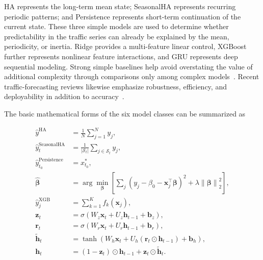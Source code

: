 \documentclass[pdflatex,sn-mathphys-num,iicol]{sn-jnl}
\begin{document}
HA represents the long-term mean state; SeasonalHA represents recurring periodic patterns; and Persistence represents short-term continuation of the current state. These three simple models are used to determine whether predictability in the traffic series can already be explained by the mean, periodicity, or inertia. Ridge provides a multi-feature linear control, XGBoost further represents nonlinear feature interactions, and GRU represents deep sequential modeling. Strong simple baselines help avoid overstating the value of additional complexity through comparisons only among complex models~\cite{Hadry2025TrafficForecasting,Hewamalage2023ForecastEvaluation}. Recent traffic-forecasting reviews likewise emphasize robustness, efficiency, and deployability in addition to accuracy~\cite{Du2025TrafficSurvey,Khatiriolyaee2026TrafficPrediction,Liu2026DeepLearningReview}.

The basic mathematical forms of the six model classes can be summarized as

\begin{equation}
\begin{aligned}
\widehat{y}^{\mathrm{HA}}
&=
\frac{1}{N}
\sum_{j=1}^{N} y_j,
\\[6pt]

\widehat{y}_{t}^{\mathrm{SeasonalHA}}
&=
\frac{1}{|\mathcal{S}_{t}|}
\sum_{j\in\mathcal{S}_{t}} y_j,
\\[6pt]

\widehat{y}_{t_0}^{\mathrm{Persistence}}
&=
x^{*}_{t_0},
\\[8pt]

\widehat{\boldsymbol{\beta}}
&=
\arg\min_{\boldsymbol{\beta}}
\left[
\sum_j
\left(
y_j-\beta_0-\mathbf{x}_j^{\top}\boldsymbol{\beta}
\right)^2
+
\lambda
\left\|
\boldsymbol{\beta}
\right\|_2^2
\right],
\\[8pt]

\widehat{y}_{j}^{\mathrm{XGB}}
&=
\sum_{k=1}^{K}
f_k(\mathbf{x}_j),
\\[8pt]

\mathbf{z}_t
&=
\sigma
\left(
W_z\mathbf{x}_t
+
U_z\mathbf{h}_{t-1}
+
\mathbf{b}_z
\right),
\\[6pt]

\mathbf{r}_t
&=
\sigma
\left(
W_r\mathbf{x}_t
+
U_r\mathbf{h}_{t-1}
+
\mathbf{b}_r
\right),
\\[6pt]

\widetilde{\mathbf{h}}_t
&=
\tanh
\left(
W_h\mathbf{x}_t
+
U_h
\left(
\mathbf{r}_t
\odot
\mathbf{h}_{t-1}
\right)
+
\mathbf{b}_h
\right),
\\[6pt]

\mathbf{h}_t
&=
\left(
1-\mathbf{z}_t
\right)
\odot
\mathbf{h}_{t-1}
+
\mathbf{z}_t
\odot
\widetilde{\mathbf{h}}_t .
\end{aligned}
\label{eq:benchmark-models}
\end{equation}
\end{document}
